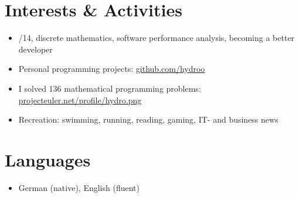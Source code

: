 \vspace{0.66cm} %

\pagebreak
\section*{Interests \& Activities}
\begin{itemize}
	\item {}/14, discrete mathematics, software performance analysis, becoming a better developer
	\item Personal programming projects: \href{https://github.com/hydroo}{github.com/hydroo}
	\item I solved 136 mathematical programming problems: \href{http://projecteuler.net/profile/hydro.png}{projecteuler.net/profile/hydro.png}
	\item Recreation: swimming, running, reading, gaming, IT- and business news
\end{itemize}

\customhrule
\section*{Languages}
\begin{itemize}
	\item German (native), English (fluent)
\end{itemize}


